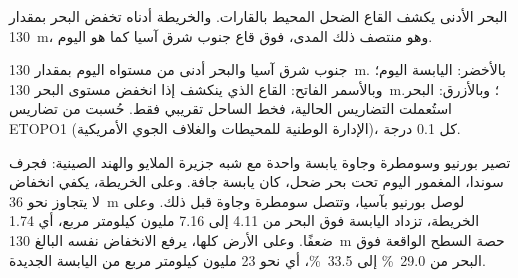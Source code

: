 البحر الأدنى يكشف القاع الضحل المحيط بالقارات. والخريطة أدناه
تخفض البحر بمقدار \qty{130}{m}، وهو منتصف ذلك المدى، فوق قاع
جنوب شرق آسيا كما هو اليوم.

\begin{omfigure}

{\small جنوب شرق آسيا والبحر أدنى من مستواه اليوم بمقدار \qty{130}{m}. بالأخضر:
اليابسة اليوم؛ وبالأسمر الفاتح: القاع الذي ينكشف إذا انخفض مستوى البحر \qty{130}{m}؛ وبالأزرق:
البحر. استُعملت التضاريس الحالية، فخط الساحل تقريبي فقط.
حُسبت من تضاريس ETOPO1 (الإدارة الوطنية للمحيطات والغلاف الجوي الأمريكية)، كل 0.1 درجة.}
\end{omfigure}

تصير بورنيو وسومطرة وجاوة يابسة واحدة مع شبه جزيرة الملايو
والهند الصينية: فجرف سوندا، المغمور اليوم تحت بحر ضحل، كان يابسة جافة. وعلى الخريطة،
يكفي انخفاض لا يتجاوز نحو \qty{36}{m} لوصل بورنيو بآسيا، وتتصل سومطرة
وجاوة قبل ذلك. وعلى الخريطة،
تزداد اليابسة فوق البحر من 4.11 إلى 7.16 مليون كيلومتر مربع،
أي 1.74 ضعفًا. وعلى الأرض كلها، يرفع الانخفاض نفسه البالغ \qty{130}{m}
حصة السطح الواقعة فوق البحر من \qty{29.0}{\percent} إلى
\qty{33.5}{\percent}، أي نحو 23 مليون كيلومتر مربع من اليابسة الجديدة.

